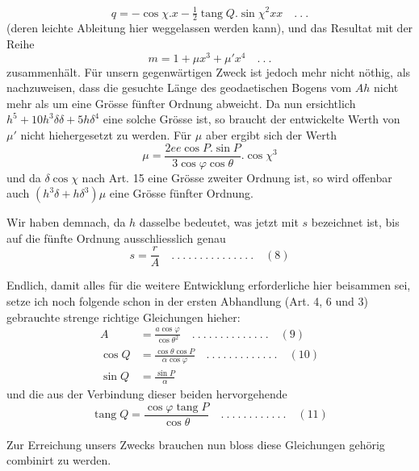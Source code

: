 \[
q=-\cos\chi\mathord{.}x-\tfrac12\operatorname{tang}Q\mathord{.}\sin\chi^2xx\quad .\ .\ .
\]
(deren leichte Ableitung hier weggelassen werden kann), und das Resultat mit der Reihe
\[
m=1+\mu x^3+\mu'x^4\quad .\ .\ .
\]
zusammenhält. Für unsern gegenwärtigen Zweck ist jedoch mehr nicht nöthig, als nachzuweisen, dass die gesuchte Länge des geodaetischen Bogens vom \(Ah\) nicht mehr als um eine Grösse fünfter Ordnung abweicht. Da nun ersichtlich \(h^5+10h^3\delta\delta+5h\delta^4\) eine solche Grösse ist, so braucht der entwickelte Werth von \(\mu'\) nicht hiehergesetzt zu werden. Für \(\mu\) aber ergibt sich der Werth
\[
\mu=\frac{2ee\cos P\mathord{.}\sin P}{3\cos\varphi\cos\theta}\mathord{.}\cos\chi^3
\]
und da \(\delta\cos\chi\) nach Art. 15 eine Grösse zweiter Ordnung ist, so wird offenbar auch \((h^3\delta+h\delta^3)\mu\) eine Grösse fünfter Ordnung.

Wir haben demnach, da \(h\) dasselbe bedeutet, was jetzt mit \(s\) bezeichnet ist, bis auf die fünfte Ordnung ausschliesslich genau
\[
s=\frac rA\quad .\ .\ .\ .\ .\ .\ .\ .\ .\ .\ .\ .\ .\ .\ .\quad(8)
\]

\indent Endlich, damit alles für die weitere Entwicklung erforderliche hier beisammen sei, setze ich noch folgende schon in der ersten Abhandlung (Art. 4, 6 und 3) gebrauchte strenge richtige Gleichungen hieher:
\[
\begin{aligned}
A&=\frac{a\cos\varphi}{\cos\theta^2}\quad .\ .\ .\ .\ .\ .\ .\ .\ .\ .\ .\ .\ .\ .\quad(9)\\
\cos Q&=\frac{\cos\theta\cos P}{\alpha\cos\varphi}\quad .\ .\ .\ .\ .\ .\ .\ .\ .\ .\ .\ .\ .\quad(10)\\
\sin Q&=\frac{\sin P}{\alpha}
\end{aligned}
\]
und die aus der Verbindung dieser beiden hervorgehende
\[
\operatorname{tang}Q=\frac{\cos\varphi\operatorname{tang}P}{\cos\theta}\quad .\ .\ .\ .\ .\ .\ .\ .\ .\ .\ .\ .\quad(11)
\]

Zur Erreichung unsers Zwecks brauchen nun bloss diese Gleichungen gehörig combinirt zu werden.
